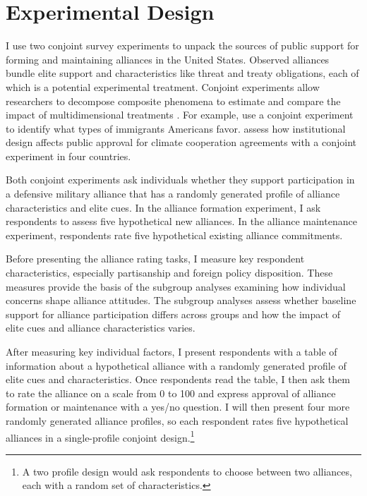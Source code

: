 \documentclass[12pt]{article}
\begin{document}
\section{Experimental Design}


I use two conjoint survey experiments to unpack the sources of public support for forming and maintaining alliances in the United States. 
Observed alliances bundle elite support and characteristics like threat and treaty obligations, each of which is a potential experimental treatment.  
Conjoint experiments allow researchers to decompose composite phenomena to estimate and compare the impact of multidimensional treatments \citep{Hainmuelleretal2014}. 
For example, \citet{HainmuellerHopkins2015} use a conjoint experiment to identify what types of immigrants Americans favor. 
\citet{BechtelScheve2013} assess how institutional design affects public approval for climate cooperation agreements with a conjoint experiment in four countries. 


Both conjoint experiments ask individuals whether they support participation in a defensive military alliance that has a randomly generated profile of alliance characteristics and elite cues. 
In the alliance formation experiment, I ask respondents to assess five hypothetical new alliances. 
In the alliance maintenance experiment, respondents rate five hypothetical existing alliance commitments.


Before presenting the alliance rating tasks, I measure key respondent characteristics, especially partisanship and foreign policy disposition.  
These measures provide the basis of the subgroup analyses examining how individual concerns shape alliance attitudes. 
The subgroup analyses assess whether baseline support for alliance participation differs across groups and how the impact of elite cues and alliance characteristics varies.


After measuring key individual factors, I present respondents with a table of information about a hypothetical alliance with a randomly generated profile of elite cues and characteristics.
Once respondents read the table, I then ask them to rate the alliance on a scale from 0 to 100 and express approval of alliance formation or maintenance with a yes/no question. 
I will then present four more randomly generated alliance profiles, so each respondent rates five hypothetical alliances in a single-profile conjoint design.\footnote{A two profile design would ask respondents to choose between two alliances, each with a random set of characteristics.} 
\end{document}
